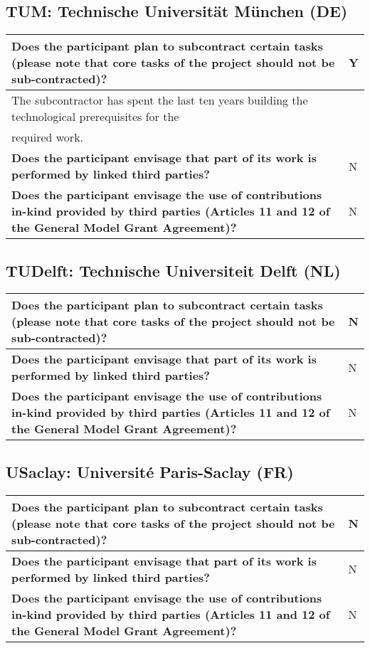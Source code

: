 \subsection*{TUM: Technische Universität München (DE)}

\begin{longtable}{|p{}|p{}|}
\hline
{\bf Does the participant plan to subcontract certain tasks (please
  note that core tasks of the project should not be sub-contracted)?}
&
Y
\\
\hline
\multicolumn{2}{|l|}{The subcontractor has spent the last ten years building the technological
  prerequisites for the}\\
\multicolumn{2}{|l|}{required work. }
\\
\hline
{\bf Does the participant envisage that  part of its work is performed
  by linked third parties?}
&
N
\\
\hline
{\bf Does the participant envisage the use of contributions in-kind
provided by third parties (Articles 11 and 12 of the General Model
Grant Agreement)?}
&
N
\\
\hline
\end{longtable}


\subsection*{TUDelft: Technische Universiteit Delft (NL)}

\begin{longtable}{|p{}|p{}|}
\hline
{\bf Does the participant plan to subcontract certain tasks (please
  note that core tasks of the project should not be sub-contracted)?}
&
N
\\
\hline
{\bf Does the participant envisage that  part of its work is performed
  by linked third parties?}
&
N
\\
\hline
{\bf Does the participant envisage the use of contributions in-kind
provided by third parties (Articles 11 and 12 of the General Model
Grant Agreement)?}
&
N
\\
\hline
\end{longtable}


\subsection*{USaclay: Université Paris-Saclay (FR)}

\begin{longtable}{|p{}|p{}|}
\hline
{\bf Does the participant plan to subcontract certain tasks (please
  note that core tasks of the project should not be sub-contracted)?}
&
N
\\
\hline
{\bf Does the participant envisage that  part of its work is performed
  by linked third parties?}
&
N
\\
\hline
{\bf Does the participant envisage the use of contributions in-kind
provided by third parties (Articles 11 and 12 of the General Model
Grant Agreement)?}
&
N
\\
\hline
\end{longtable}

